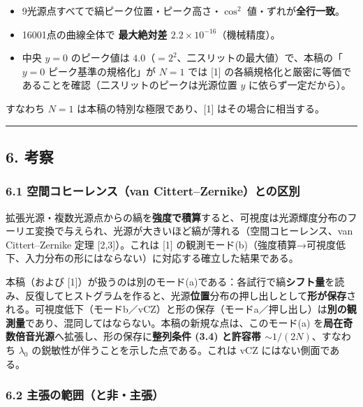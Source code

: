 \documentclass[
]{ltjsarticle}
\providecommand{\tightlist}{%
  \setlength{\itemsep}{0pt}\setlength{\parskip}{0pt}}
\begin{document}
\begin{itemize}
\tightlist
\item
  9光源点すべてで縞ピーク位置・ピーク高さ・\(\cos^2\)
  値・ずれが\textbf{全行一致}。
\item
  16001点の曲線全体で \textbf{最大絶対差
  \(2.2\times10^{-16}\)}（機械精度）。
\item
  中央 \(y=0\) のピーク値は
  \(4.0\)（\(=2^2\)、二スリットの最大値）で、本稿の「\(y=0\)
  ピーク基準の規格化」が \(N=1\) では {[}1{]}
  の各縞規格化と厳密に等価であることを確認（二スリットのピークは光源位置
  \(y\) に依らず一定だから）。
\end{itemize}

すなわち \(N=1\) は本稿の特別な極限であり、{[}1{]}
はその場合に相当する。

\begin{center}\rule{0.5\linewidth}{0.5pt}\end{center}

\subsection{6. 考察}\label{ux8003ux5bdf}

\subsubsection{6.1 空間コヒーレンス（van
Cittert--Zernike）との区別}\label{ux7a7aux9593ux30b3ux30d2ux30fcux30ecux30f3ux30b9van-cittertzernikeux3068ux306eux533aux5225}

拡張光源・複数光源点からの縞を\textbf{強度で積算}すると、可視度は光源輝度分布のフーリエ変換で与えられ、光源が大きいほど縞が薄れる（空間コヒーレンス、van
Cittert--Zernike 定理 {[}2,3{]}）。これは {[}1{]}
の観測モード(b)（強度積算→可視度低下、入力分布の形にはならない）に対応する確立した結果である。

本稿（および
{[}1{]}）が扱うのは別のモード(a)である：各試行で縞\textbf{シフト量}を読み、反復してヒストグラムを作ると、光源\textbf{位置}分布の押し出しとして\textbf{形が保存}される。可視度低下（モードb／vCZ）と形の保存（モードa／押し出し）は\textbf{別の観測量}であり、混同してはならない。本稿の新規な点は、このモード(a)
を\textbf{局在奇数倍音光源}へ拡張し、形の保存に\textbf{整列条件 (3.4)
と許容帯 \(\sim1/(2N)\)}、すなわち \(\lambda_0\)
の鋭敏性が伴うことを示した点である。これは vCZ にはない側面である。

\subsubsection{6.2
主張の範囲（と非・主張）}\label{ux4e3bux5f35ux306eux7bc4ux56f2ux3068ux975eux4e3bux5f35}
\end{document}
